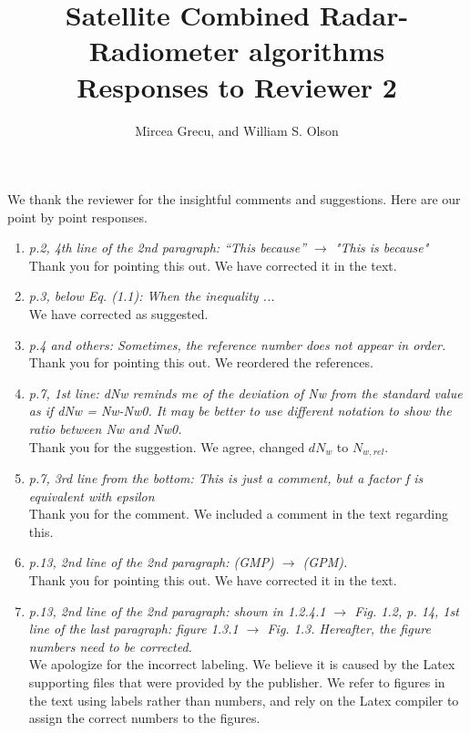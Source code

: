 \documentclass[12pt]{article}
\author{Mircea Grecu, and William S. Olson}
\title{Satellite Combined Radar-Radiometer
algorithms\\
Responses to Reviewer 2}
\date{}
\begin{document}
\maketitle


We thank the reviewer for the insightful comments and suggestions. 
Here are our point by point responses.

\begin{enumerate}
    \item{\textit{p.2, 4th line of the 2nd paragraph: “This because” $\rightarrow$ "This is because"}\\
    Thank you for pointing this out.  We have corrected it in the text.
    }
    \item{\textit{p.3, below Eq. (1.1): When the inequality ...}\\
    We have corrected as suggested.
    }
    \item{\textit{p.4 and others: Sometimes, the reference number does not appear in order.}\\
    Thank you for pointing this out.  We reordered the references.
    }
    \item{\textit {p.7, 1st line: dNw reminds me of the deviation of Nw from the standard value as if dNw = Nw-Nw0. 
    It may be better to use different notation to show the ratio between Nw and Nw0.}\\
    Thank you for the suggestion. We agree, changed $dN_w$ to $N_{w,rel}$.
    }
    \item{\textit{p.7, 3rd line from the bottom: This is just a comment, but a factor f is equivalent with epsilon}\\
    Thank you for the comment. We included a comment in the text regarding this.
    }
    \item{\textit{p.13, 2nd line of the 2nd paragraph: (GMP) $\rightarrow$ (GPM).}\\
    Thank you for pointing this out.  We have corrected it in the text.
    }
    \item{\textit{p.13, 2nd line of the 2nd paragraph: shown in 1.2.4.1 $\rightarrow$ Fig. 1.2,
    p. 14, 1st line of the last paragraph: figure 1.3.1 $\rightarrow$ Fig. 1.3. Hereafter, the figure numbers need to be corrected.}\\
    We apologize for the incorrect labeling. We believe it is caused by the Latex supporting files that were provided by the publisher. 
    We refer to figures in the text using labels rather than numbers, and rely on the Latex compiler to assign the correct numbers to the figures.
}
\end{enumerate}
\end{document}
